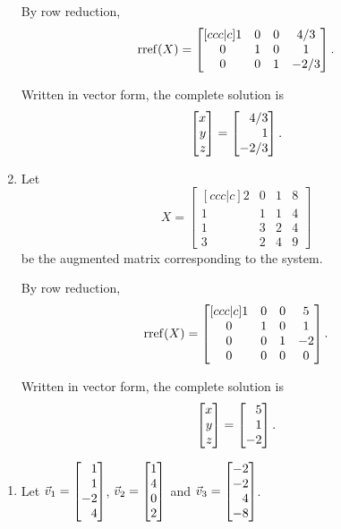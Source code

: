 \begin{exercises}
\begin{problist}
\begin{solution}
\begin{enumerate}
				By row reduction,
				\[
					\operatorname{rref}(X)=
					\begin{bmatrix}[ccc|c]
						1 & 0 & 0 & 4/3\\
						0 & 1 & 0 & 1\\
						0 & 0 & 1 & -2/3
					\end{bmatrix}.
				\]
				
				Written in vector form, the complete solution is
				\[
					\mat{x\\y\\z} = \mat{4/3\\1\\-2/3}.
				\]
				\item 
				Let
				\[
					X=
					\begin{bmatrix}[ccc|c]
						2 & 0 & 1 & 8\\
						1 & 1 & 1 & 4\\
						1 & 3 & 2 & 4\\
						3 & 2 & 4 & 9
					\end{bmatrix}
				\]
				be the augmented matrix corresponding to the system.
				
				By row reduction,
				\[
					\operatorname{rref}(X)=
					\begin{bmatrix}[ccc|c]
						1 & 0 & 0 & 5\\
						0 & 1 & 0 & 1\\
						0 & 0 & 1 & -2\\
						0 & 0 & 0 & 0
					\end{bmatrix}.
				\]
				
				Written in vector form, the complete solution is
				\[
					\mat{x\\y\\z} = \mat{5\\1\\-2}.
				\]
			\end{enumerate}
		\end{solution}
		\prob 
		\begin{enumerate}
			\item Let $\vec v_{1}=\mat{1\\1\\-2\\4}$,
			$\vec v_{2}=\mat{1\\4\\0\\2}$ and
			$\vec v_{3}=\mat{-2\\-2\\4\\-8}$.
			

\end{enumerate}
\end{problist}
\end{exercises}
